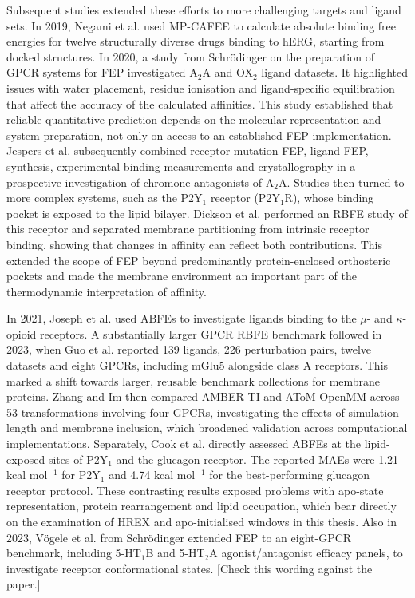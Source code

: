 Subsequent studies extended these efforts to more challenging targets and ligand sets. In 2019, Negami et al. used MP-CAFEE to calculate absolute binding free energies for twelve structurally diverse drugs binding to hERG, starting from docked structures. In 2020, a study from Schrödinger on the preparation of GPCR systems for FEP investigated A$_2$A and OX$_2$ ligand datasets. It highlighted issues with water placement, residue ionisation and ligand-specific equilibration that affect the accuracy of the calculated affinities. This study established that reliable quantitative prediction depends on the molecular representation and system preparation, not only on access to an established FEP implementation. Jespers et al. subsequently combined receptor-mutation FEP, ligand FEP, synthesis, experimental binding measurements and crystallography in a prospective investigation of chromone antagonists of A$_2$A. Studies then turned to more complex systems, such as the P2Y$_1$ receptor (P2Y$_1$R), whose binding pocket is exposed to the lipid bilayer. Dickson et al. performed an RBFE study of this receptor and separated membrane partitioning from intrinsic receptor binding, showing that changes in affinity can reflect both contributions. This extended the scope of FEP beyond predominantly protein-enclosed orthosteric pockets and made the membrane environment an important part of the thermodynamic interpretation of affinity.

In 2021, Joseph et al. used ABFEs to investigate ligands binding to the $\mu$- and $\kappa$-opioid receptors. A substantially larger GPCR RBFE benchmark followed in 2023, when Guo et al. reported 139 ligands, 226 perturbation pairs, twelve datasets and eight GPCRs, including mGlu5 alongside class A receptors. This marked a shift towards larger, reusable benchmark collections for membrane proteins. Zhang and Im then compared AMBER-TI and AToM-OpenMM across 53 transformations involving four GPCRs, investigating the effects of simulation length and membrane inclusion, which broadened validation across computational implementations. Separately, Cook et al. directly assessed ABFEs at the lipid-exposed sites of P2Y$_1$ and the glucagon receptor. The reported MAEs were 1.21 kcal mol$^{-1}$ for P2Y$_1$ and 4.74 kcal mol$^{-1}$ for the best-performing glucagon receptor protocol. These contrasting results exposed problems with apo-state representation, protein rearrangement and lipid occupation, which bear directly on the examination of HREX and apo-initialised windows in this thesis. Also in 2023, Vögele et al. from Schrödinger extended FEP to an eight-GPCR benchmark, including 5-HT$_1$B and 5-HT$_2$A agonist/antagonist efficacy panels, to investigate receptor conformational states. [Check this wording against the paper.]

